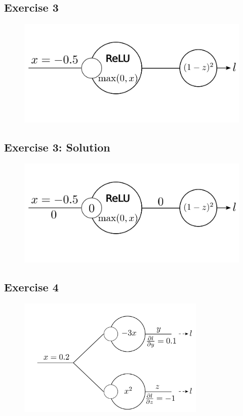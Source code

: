 \documentclass{book}
\begin{document}
\subsection{Exercise 3}

\begin{figure}[h]
    \centering
    \includegraphics[width=\textwidth]{bp_relu_exo2.png}
\end{figure}

\subsection{Exercise 3: Solution}

\begin{figure}[h]
    \centering
    \includegraphics[width=\textwidth]{bp_relu_exo2_sol.png}
\end{figure}

\subsection{Exercise 4}

\begin{figure}[h]
    \centering
    \includegraphics[width=0.8\textwidth]{bp_split.png}
\end{figure}
\end{document}

